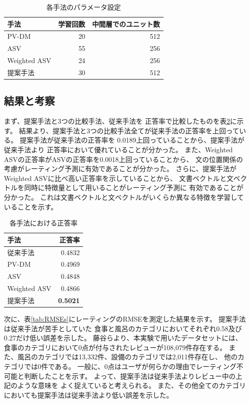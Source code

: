 \documentclass{ttithesis}
\begin{document}
\begin{table}[b!]
  \caption{各手法のパラメータ設定}
  \centering
  \begin{tabular}{l | r r} \label{tab:ParametersOfMethods}
    手法 & 学習回数 & 中間層でのユニット数 \\
    \hline
    PV-DM & 20 & 512 \\
    ASV & 55 & 256 \\
    Weighted ASV & 24 & 256 \\
    提案手法 & 30 & 512 \\
  \end{tabular}
\end{table}


\subsection{結果と考察}

まず、提案手法と3つの比較手法、従来手法\cite{fujitani15}を
正答率で比較したものを表\ref{tab:Accuracies}に示す。
結果より、提案手法と3つの比較手法全てが従来手法の正答率を上回っている。
提案手法が従来手法\cite{fujitani15}の正答率を
0.0189上回っていることから、提案手法が従来手法\cite{fujitani15}より
正答率において優れていることが分かった。
また、Weighted ASVの正答率がASVの正答率を0.0018上回っていることから、
文の位置関係の考慮がレーティング予測に有効であることが分かった。
さらに、提案手法がWeighted ASVに比べ高い正答率を示していることから、
文書ベクトルと文ベクトルを同時に特徴量として用いることがレーティング予測に
有効であることが分かった。
これは文書ベクトルと文ベクトルがいくらか異なる特徴を学習していることを示す。

\begin{table}[b!]
  \caption{各手法における正答率}
  \centering
  \begin{tabular}{l | r} \label{tab:Accuracies}
    手法 & 正答率 \\
    \hline
    従来手法\cite{fujitani15}  & 0.4832 \\
    PV-DM & 0.4969 \\
    ASV & 0.4848 \\
    Weighted ASV & 0.4866 \\
    提案手法 & \textbf{0.5021} \\
  \end{tabular}
\end{table}

次に、表\ref{tab:RMSEs}にレーティングのRMSEを測定した結果を示す。
提案手法は従来手法\cite{fujitani15}が苦手としていた
食事と風呂のカテゴリにおいてそれぞれ0.58及び0.27だけ低い誤差を示した。
藤谷ら\cite{fujitani15}より、本実験で用いたデータセットには、
食事のカテゴリにおいて0点が付与されたレビューが108,079件存在する。
また、風呂のカテゴリでは13,332件、設備のカテゴリでは2,011件存在し、
他のカテゴリでは0件である。
一般に、0点はユーザが何らかの理由でレーティング不可能と判断したことを示す。
よって、提案手法は従来手法\cite{fujitani15}よりレビュー中の上記のような意味を
よく捉えていると考えられる。
また、その他全てのカテゴリにおいても提案手法は従来手法より低い誤差を示した。
\end{document}

